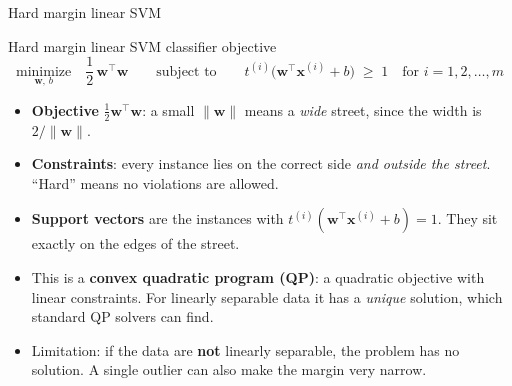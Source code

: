 \documentclass[aspectratio=169,10pt]{beamer}
\newcommand{\w}{\mathbf{w}}
\newcommand{\x}{\mathbf{x}}
\begin{document}
\begin{frame}{Hard margin linear SVM}
\begin{alertblock}{Hard margin linear SVM classifier objective}
\[
  \underset{\w,\,b}{\text{minimize}}\quad \frac12\,\w^\top\w
  \qquad\text{subject to}\qquad
  t^{(i)}\big(\w^\top\x^{(i)} + b\big) \;\ge\; 1 \quad\text{for } i=1,2,\dots,m
\]
\end{alertblock}
\begin{itemize}
  \item \textbf{Objective} $\tfrac12\w^\top\w$: a small $\lVert\w\rVert$ means a \emph{wide} street, since the width is $2/\lVert\w\rVert$.
  \item \textbf{Constraints}: every instance lies on the correct side \emph{and outside the street}. ``Hard'' means no violations are allowed.
  \item \textbf{Support vectors} are the instances with $t^{(i)}(\w^\top\x^{(i)}+b)=1$. They sit exactly on the edges of the street.
  \item This is a \textbf{convex quadratic program (QP)}: a quadratic objective with linear constraints. For linearly separable data it has a \emph{unique} solution, which standard QP solvers can find.
  \item \alert{Limitation:} if the data are \textbf{not} linearly separable, the problem has no solution. A single outlier can also make the margin very narrow.
\end{itemize}
\end{frame}
\end{document}
